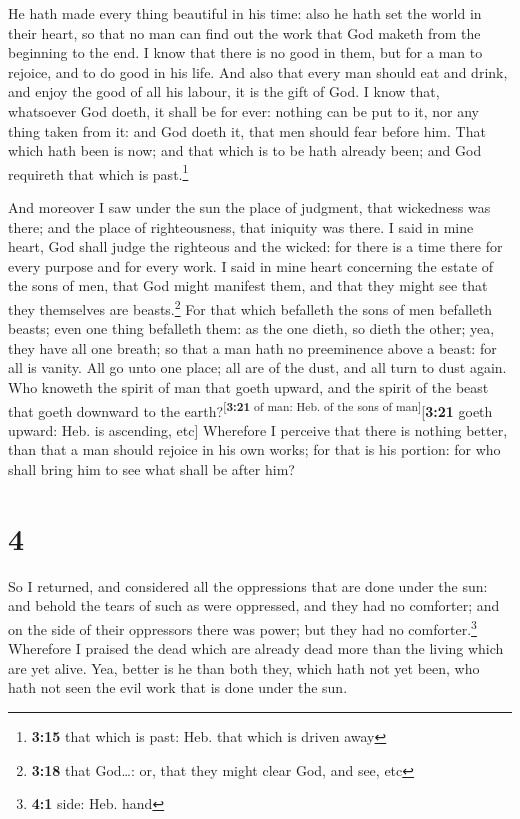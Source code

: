  He hath made every thing beautiful in his time: also he
hath set the world in their heart, so that no man can find out the work
that God maketh from the beginning to the end.  I know
that there is no good in them, but for a man to rejoice, and to do good
in his life.  And also that every man should eat and
drink, and enjoy the good of all his labour, it is the gift of God.
 I know that, whatsoever God doeth, it shall be for ever:
nothing can be put to it, nor any thing taken from it: and God doeth it,
that men should fear before him.  That which hath been is
now; and that which is to be hath already been; and God requireth that
which is past.\footnote{\textbf{3:15} that which is past: Heb. that
  which is driven away}

 And moreover I saw under the sun the place of judgment,
that wickedness was there; and the place of righteousness, that iniquity
was there.  I said in mine heart, God shall judge the
righteous and the wicked: for there is a time there for every purpose
and for every work.  I said in mine heart concerning the
estate of the sons of men, that God might manifest them, and that they
might see that they themselves are beasts.\footnote{\textbf{3:18} that
  God\ldots: or, that they might clear God, and see, etc}
 For that which befalleth the sons of men befalleth
beasts; even one thing befalleth them: as the one dieth, so dieth the
other; yea, they have all one breath; so that a man hath no preeminence
above a beast: for all is vanity.  All go unto one place;
all are of the dust, and all turn to dust again.  Who
knoweth the spirit of man that goeth upward, and the spirit of the beast
that goeth downward to the earth?\textsuperscript{{[}\textbf{3:21} of
man: Heb. of the sons of man{]}}{[}\textbf{3:21} goeth upward: Heb. is
ascending, etc{]}  Wherefore I perceive that there is
nothing better, than that a man should rejoice in his own works; for
that is his portion: for who shall bring him to see what shall be after
him?

\hypertarget{section-3}{%
\section{4}\label{section-3}}

 So I returned, and considered all the oppressions that
are done under the sun: and behold the tears of such as were oppressed,
and they had no comforter; and on the side of their oppressors there was
power; but they had no comforter.\footnote{\textbf{4:1} side: Heb. hand}
 Wherefore I praised the dead which are already dead more
than the living which are yet alive.  Yea, better is he
than both they, which hath not yet been, who hath not seen the evil work
that is done under the sun.

